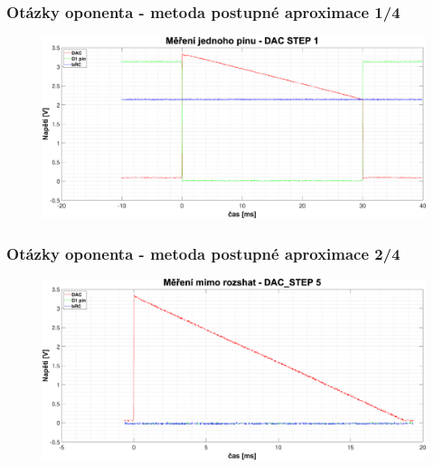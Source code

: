 \documentclass[%
  12pt,       				%
	t,                  %
	aspectratio=1610,   %
	unicode,						%
]{beamer}				    	%
\begin{document}

\begin{frame} 
	\frametitle{Otázky oponenta - metoda postupné aproximace 1/4}
	\vspace*{0.5cm}
	\begin{figure}[ht!]
		\centering
		\includegraphics[width = \textwidth]{obrazky/matlab_generated/pin_step1.eps}
	\end{figure}
\end{frame}

\begin{frame} 
	\frametitle{Otázky oponenta - metoda postupné aproximace 2/4}
	\vspace*{0.5cm}
	\begin{figure}[ht!]
		\centering
		\includegraphics[width = \textwidth]{obrazky/matlab_generated/pin_out_of_range.eps}
	\end{figure}
\end{frame}
\end{document}
